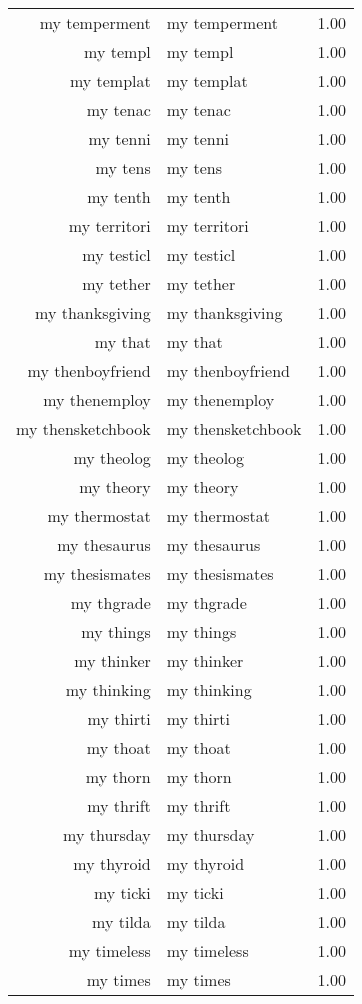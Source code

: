 \begin{table}[ht]
\begin{tabular}{rlr}
  my temperment & my temperment & 1.00 \\ 
  my templ & my templ & 1.00 \\ 
  my templat & my templat & 1.00 \\ 
  my tenac & my tenac & 1.00 \\ 
  my tenni & my tenni & 1.00 \\ 
  my tens & my tens & 1.00 \\ 
  my tenth & my tenth & 1.00 \\ 
  my territori & my territori & 1.00 \\ 
  my testicl & my testicl & 1.00 \\ 
  my tether & my tether & 1.00 \\ 
  my thanksgiving & my thanksgiving & 1.00 \\ 
  my that & my that & 1.00 \\ 
  my thenboyfriend & my thenboyfriend & 1.00 \\ 
  my thenemploy & my thenemploy & 1.00 \\ 
  my thensketchbook & my thensketchbook & 1.00 \\ 
  my theolog & my theolog & 1.00 \\ 
  my theory & my theory & 1.00 \\ 
  my thermostat & my thermostat & 1.00 \\ 
  my thesaurus & my thesaurus & 1.00 \\ 
  my thesismates & my thesismates & 1.00 \\ 
  my thgrade & my thgrade & 1.00 \\ 
  my things & my things & 1.00 \\ 
  my thinker & my thinker & 1.00 \\ 
  my thinking & my thinking & 1.00 \\ 
  my thirti & my thirti & 1.00 \\ 
  my thoat & my thoat & 1.00 \\ 
  my thorn & my thorn & 1.00 \\ 
  my thrift & my thrift & 1.00 \\ 
  my thursday & my thursday & 1.00 \\ 
  my thyroid & my thyroid & 1.00 \\ 
  my ticki & my ticki & 1.00 \\ 
  my tilda & my tilda & 1.00 \\ 
  my timeless & my timeless & 1.00 \\ 
  my times & my times & 1.00 \\ 

\end{tabular}
\end{table}
